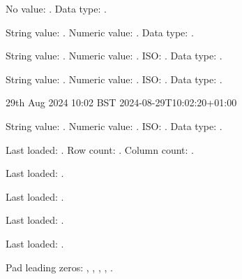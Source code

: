 \documentclass{article}
\begin{document}
No value: \dtlnovalue. Data type: \DTLdatumtype{\dtlnovalue}.

\DTLparse{}%
String value: \mydatum. Numeric value: \DTLdatumvalue{\mydatum}.
Data type: \DTLdatumtype{\mydatum}.

\DTLparse{}%
String value: \mydatum. Numeric value: \DTLdatumvalue{\mydatum}.
{\renewcommand\DTLtemporalvalue[2]{#2}ISO: \DTLdatumvalue{\mydatum}}.
Data type: \DTLdatumtype{\mydatum}.

\DTLparse{}%
String value: \mydatum. Numeric value: \DTLdatumvalue{\mydatum}.
{\renewcommand\DTLtemporalvalue[2]{#2}ISO: \DTLdatumvalue{\mydatum}}.
Data type: \DTLdatumtype{\mydatum}.

\DTLsettemporaldatum{\mydatum}
 {29th Aug 2024 10:02 BST}
 {2024-08-29T10:02:20+01:00}

String value: \mydatum. Numeric value: \DTLdatumvalue{\mydatum}.
{\renewcommand\DTLtemporalvalue[2]{#2}ISO: \DTLdatumvalue{\mydatum}}.
Data type: \DTLdatumtype{\mydatum}.


Last loaded: \dtllastloadeddb.
Row count: .
Column count: .


Last loaded: \dtllastloadeddb.


Last loaded: \dtllastloadeddb.


Last loaded: \dtllastloadeddb.


Last loaded: \dtllastloadeddb.





Pad leading zeros: ,
, ,
, .






\end{document}
